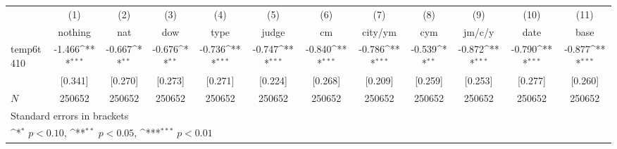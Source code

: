 {
\def\sym#1{\ifmmode^{#1}\else\(^{#1}\)\fi}
\begin{tabular}{l*{11}{c}}
\hline\hline
            &\multicolumn{1}{c}{(1)}&\multicolumn{1}{c}{(2)}&\multicolumn{1}{c}{(3)}&\multicolumn{1}{c}{(4)}&\multicolumn{1}{c}{(5)}&\multicolumn{1}{c}{(6)}&\multicolumn{1}{c}{(7)}&\multicolumn{1}{c}{(8)}&\multicolumn{1}{c}{(9)}&\multicolumn{1}{c}{(10)}&\multicolumn{1}{c}{(11)}\\
            &\multicolumn{1}{c}{nothing}&\multicolumn{1}{c}{nat}&\multicolumn{1}{c}{dow}&\multicolumn{1}{c}{type}&\multicolumn{1}{c}{judge}&\multicolumn{1}{c}{cm}&\multicolumn{1}{c}{city/ym}&\multicolumn{1}{c}{cym}&\multicolumn{1}{c}{jm/c/y}&\multicolumn{1}{c}{date}&\multicolumn{1}{c}{base}\\
\hline
temp6t410   &      -1.466\sym{***}&      -0.667\sym{**} &      -0.676\sym{**} &      -0.736\sym{***}&      -0.747\sym{***}&      -0.840\sym{***}&      -0.786\sym{***}&      -0.539\sym{**} &      -0.872\sym{***}&      -0.790\sym{***}&      -0.877\sym{***}\\
            &     [0.341]         &     [0.270]         &     [0.273]         &     [0.271]         &     [0.224]         &     [0.268]         &     [0.209]         &     [0.259]         &     [0.253]         &     [0.277]         &     [0.260]         \\
\hline
\(N\)       &      250652         &      250652         &      250652         &      250652         &      250652         &      250652         &      250652         &      250652         &      250652         &      250652         &      250652         \\
\hline\hline
\multicolumn{12}{l}{\footnotesize Standard errors in brackets}\\
\multicolumn{12}{l}{\footnotesize \sym{*} \(p<0.10\), \sym{**} \(p<0.05\), \sym{***} \(p<0.01\)}\\
\end{tabular}
}
